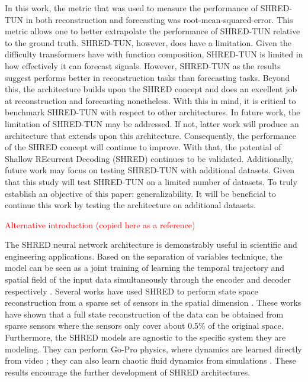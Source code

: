 \documentclass[11pt, a4paper]{article}
\begin{document}
In this work, the metric that was used to measure the performance of SHRED-TUN in both reconstruction and forecasting was root-mean-squared-error. This metric allows one to better
extrapolate the performance of SHRED-TUN relative to the ground truth.
SHRED-TUN, however, does have a limitation. Given the difficulty transformers have with function
composition, SHRED-TUN is limited in how effectively it can forecast signals. However, SHRED-TUN
as the results suggest performs better in reconstruction tasks than forecasting tasks. Beyond this, the
architecture builds upon the SHRED concept and does an excellent job at reconstruction and forecasting
nonetheless. With this in mind, it is critical to benchmark SHRED-TUN with respect to other architectures.
In future work, the limitation of SHRED-TUN may be addressed. If not, latter work will produce an
architecture that extends upon this architecture. Consequently, the performance of the SHRED concept will
continue to improve. With that, the potential of Shallow REcurrent Decoding (SHRED) continues to be
validated. Additionally, future work may focus on testing SHRED-TUN with additional datasets. Given
that this study will test SHRED-TUN on a limited number of datasets. To truly establish an objective of this
paper: generalizability. It will be beneficial to continue this work by testing the architecture on additional
datasets.

\textcolor{red}{Alternative introduction (copied here as a reference)}

The SHRED neural network architecture is demonstrably useful in scientific and engineering applications. Based on the separation of variables technique, the model can be seen as a joint training of learning the temporal trajectory and spatial field of the input data simultaneously through the encoder and decoder respectively \cite{williams2024sensing}. Several works have used SHRED to perform state space reconstruction from a sparse set of sensors in the spatial dimension \cite{williams2024sensing, tomasetto2025reducedordermodelingshallow, gao2025sparseidentificationnonlineardynamics}. These works have shown that a full state reconstruction of the data can be obtained from sparse sensors where the sensors only cover about 0.5\% of the original space. Furthermore, the SHRED models are agnostic to the specific system they are modeling. They can perform Go-Pro physics, where dynamics are learned directly from video \cite{gao2025sparseidentificationnonlineardynamics, tomasetto2025reducedordermodelingshallow}; they can also learn chaotic fluid dynamics from simulations \cite{tomasetto2025reducedordermodelingshallow, gao2025sparseidentificationnonlineardynamics}. These results encourage the further development of SHRED architectures.
\end{document}
